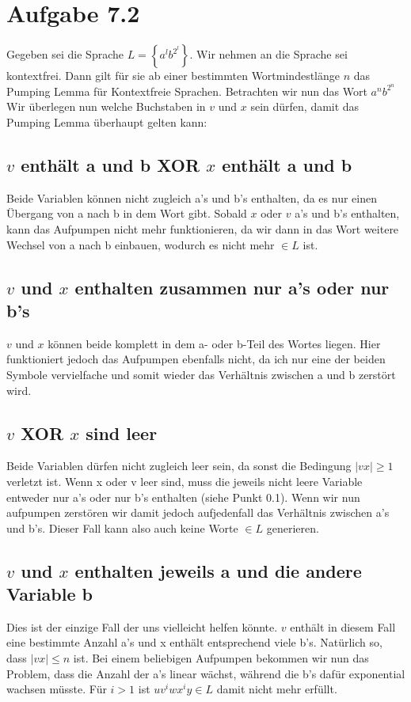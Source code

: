 \documentclass{article}
\begin{document}
\section*{Aufgabe 7.2}
Gegeben sei die Sprache $L = \left\{ a^lb^{2^l} \right\}$. Wir nehmen an die Sprache sei kontextfrei. Dann gilt für sie ab einer bestimmten Wortmindestlänge $n$ das Pumping Lemma für Kontextfreie Sprachen. Betrachten wir nun das Wort $a^nb^{2^n}$ Wir überlegen nun welche Buchstaben in $v$ und $x$ sein dürfen, damit das Pumping Lemma überhaupt gelten kann:

\subsection{$v$ enthält a und b XOR $x$ enthält a und b}
Beide Variablen können nicht zugleich a's und b's enthalten, da es nur einen Übergang von a nach b in dem Wort gibt. Sobald $x$ oder $v$ a's und b's enthalten, kann das Aufpumpen nicht mehr funktionieren, da wir dann in das Wort weitere Wechsel von a nach b einbauen, wodurch es nicht mehr $\in L$ ist.

\subsection{$v$ und $x$ enthalten zusammen nur a's oder nur b's}
$v$ und $x$ können beide komplett in dem a- oder b-Teil des Wortes liegen. Hier funktioniert jedoch das Aufpumpen ebenfalls nicht, da ich nur eine der beiden Symbole vervielfache und somit wieder das Verhältnis zwischen a und b zerstört wird.

\subsection{$v$ XOR $x$ sind leer}
Beide Variablen dürfen nicht zugleich leer sein, da sonst die Bedingung $|vx|\geq 1$ verletzt ist. Wenn x oder v leer sind, muss die jeweils nicht leere Variable entweder nur a's oder nur b's enthalten (siehe Punkt 0.1). Wenn wir nun aufpumpen zerstören wir damit jedoch aufjedenfall das Verhältnis zwischen a's und b's. Dieser Fall kann also auch keine Worte $\in L$ generieren.

\subsection{$v$ und $x$ enthalten jeweils a und die andere Variable b}
Dies ist der einzige Fall der uns vielleicht helfen könnte. $v$ enthält in diesem Fall eine bestimmte Anzahl a's und x enthält entsprechend viele b's. Natürlich so, dass $|vx| \leq n$ ist. Bei einem beliebigen Aufpumpen bekommen wir nun das Problem, dass die Anzahl der a's linear wächst, während die b's dafür exponential wachsen müsste. Für $i>1$ ist $uv^iwx^iy\in L$ damit nicht mehr erfüllt.
\end{document}
